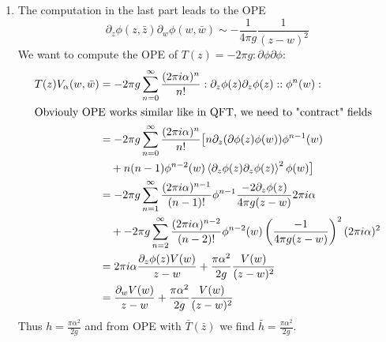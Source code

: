 \begin{enumerate}[label=(\alph*)]
	\item The computation in the last part leads to the OPE
		\begin{equation}
			\partial_z \phi (z,\bar{z}) \partial_w \phi(w,\bar{w}) \sim - \frac{1}{4\pi g} \frac{1}{(z-w)^2}
		\end{equation}
		We want to compute the OPE of $T(z) = -2 \pi g :\partial \phi \partial \phi:$
		\begin{align*}
			T(z) V_\alpha (w,\bar{w}) &= -2\pi g \sum_{n=0}^{\infty} \frac{(2\pi i \alpha)^n}{n!} :\partial_z \phi(z) \partial_z \phi(z):  :\phi^n(w): \\
												  \shortintertext{Obviouly OPE works similar like in QFT, we need to "contract" fields}
											  &= -2\pi g \sum_{n=0}^{\infty} \frac{(2\pi i \alpha)^n}{n!} \big[ n \partial_z (\partial \phi (z) \phi(w)) \phi^{n-1} (w) \\
											  &\quad  + n(n-1) \phi^{n-2}(w) \expval{\partial_z \phi(z) \partial_z \phi(z)}^2 \phi(w) \big] \\
											  &= -2\pi g \sum_{n=1}^{\infty} \frac{(2\pi i \alpha)^{n-1}}{(n-1)!} \phi^{n-1} \frac{-2\partial_z \phi(z)}{4\pi g(z-w)} 2\pi i \alpha \\
											  &\quad +  -2\pi g \sum_{n=2}^{\infty} \frac{(2\pi i \alpha)^{n-2}}{(n-2)!} \phi^{n-2}(w) \left( \frac{-1}{4\pi g (z-w)} \right)^2 (2\pi i \alpha)^2 \\
											  &= 2\pi i \alpha \frac{\partial_z \phi(z) V(w)}{z-w} + \frac{\pi \alpha^2}{2g} \frac{V(w)}{(z-w)^2} \\
											  &=  \frac{\partial_w V(w)}{z-w} + \frac{\pi \alpha^2}{2g} \frac{V(w)}{(z-w)^2}
		\end{align*}
		Thus $h=\frac{\pi \alpha^2}{2g}$ and from OPE with $\bar{T}(\bar{z})$ we find $\bar{h}=\frac{\pi \alpha^2}{2g}$.
\end{enumerate}

